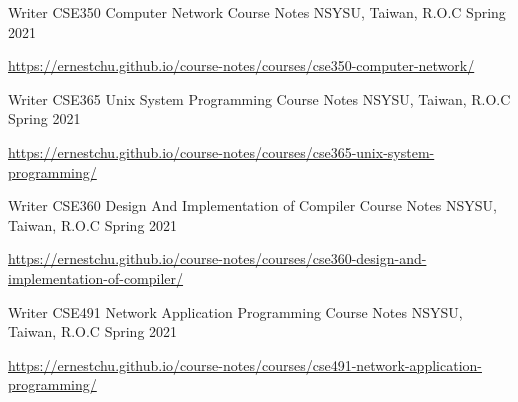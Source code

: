 

\begin{cventries}

  \cventry
    {Writer} %
    {CSE350 Computer Network Course Notes} %
    {NSYSU, Taiwan, R.O.C} %
    {Spring 2021} %
    {
      \begin{cvitems} %
        \item {\href{https://ernestchu.github.io/course-notes/courses/cse350-computer-network/}{https://ernestchu.github.io/course-notes/courses/cse350-computer-network/}}
      \end{cvitems}
    }

  \cventry
    {Writer} %
    {CSE365 Unix System Programming Course Notes} %
    {NSYSU, Taiwan, R.O.C} %
    {Spring 2021} %
    {
      \begin{cvitems} %
        \item {\href{https://ernestchu.github.io/course-notes/courses/cse365-unix-system-programming/}{https://ernestchu.github.io/course-notes/courses/cse365-unix-system-programming/}}
      \end{cvitems}
    }

  \cventry
    {Writer} %
    {CSE360 Design And Implementation of Compiler Course Notes} %
    {NSYSU, Taiwan, R.O.C} %
    {Spring 2021} %
    {
      \begin{cvitems} %
        \item {\href{https://ernestchu.github.io/course-notes/courses/cse360-design-and-implementation-of-compiler/}{https://ernestchu.github.io/course-notes/courses/cse360-design-and-implementation-of-compiler/}}
      \end{cvitems}
    }

  \cventry
    {Writer} %
    {CSE491 Network Application Programming Course Notes} %
    {NSYSU, Taiwan, R.O.C} %
    {Spring 2021} %
    {
      \begin{cvitems} %
        \item {\href{https://ernestchu.github.io/course-notes/courses/cse491-network-application-programming/}{https://ernestchu.github.io/course-notes/courses/cse491-network-application-programming/}}
      \end{cvitems}
    }

\end{cventries}
